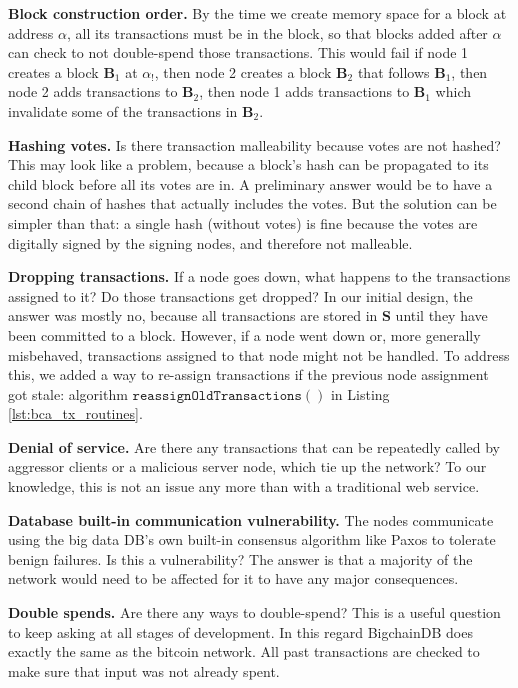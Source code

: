 \medskip
\noindent\textbf{Block construction order.}
By the time we create memory space for a block at address $\alpha$, all its transactions must be in the block, so that blocks added after $\alpha$ can check to not double-spend those transactions.
This would fail if node 1 creates a block $\mathbf{B}_1$ at $\alpha_!$, then node 2 creates a block $\mathbf{B}_2$ that follows $\mathbf{B}_1$, then node 2 adds transactions to $\mathbf{B}_2$, then node 1 adds transactions to $\mathbf{B}_1$ which invalidate some of the transactions in $\mathbf{B}_2$.

\medskip
\noindent\textbf{Hashing votes.} Is there transaction malleability because votes are not hashed?
This may look like a problem, because a block’s hash can be propagated to its child block before all its votes are in.
A preliminary answer would be to have a second chain of hashes that actually includes the votes.
But the solution can be simpler than that: a single hash (without votes) is fine because the votes are digitally signed by the signing nodes, and therefore not malleable.

\medskip
\noindent\textbf{Dropping transactions.} If a node goes down, what happens to the transactions assigned to it? Do those transactions get dropped?
In our initial design, the answer was mostly no, because all transactions are stored in $\mathbf{S}$ until they have been committed to a block.
However, if a node went down or, more generally misbehaved, transactions assigned to that node might not be handled.
To address this, we added a way to re-assign transactions if the previous node assignment got stale: algorithm $\mathtt{reassignOldTransactions()}$ in Listing \ref{lst:bca_tx_routines}.

\medskip
\noindent\textbf{Denial of service.} Are there any transactions that can be repeatedly called by aggressor clients or a malicious server node, which tie up the network?
To our knowledge, this is not an issue any more than with a traditional web service.

\medskip
\noindent\textbf{Database built-in communication vulnerability.} The nodes communicate using the big data DB’s own built-in consensus algorithm like Paxos to tolerate benign failures. 
Is this a vulnerability? The answer is that a majority of the network would need to be affected for it to have any major consequences.

\medskip
\noindent\textbf{Double spends.} Are there any ways to double-spend? 
This is a useful question to keep asking at all stages of development. 
In this regard BigchainDB does exactly the same as the bitcoin network. All past transactions are checked to make sure that input was not already spent.


